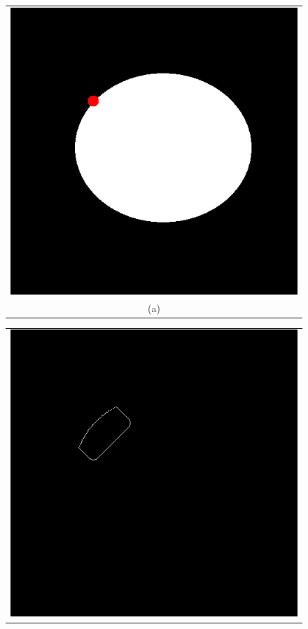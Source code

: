 \begin{figure}[h!]
\centering
\begin{minipage}{.49\textwidth}
\begin{tabular}{c}
\includegraphics[width=.9\textwidth]{results/circleSeedPartlyOutside} \\
(a)
\end{tabular}
\end{minipage}
\begin{minipage}{.49\textwidth}
\begin{tabular}{c}
\includegraphics[width=.9\textwidth]{results/circleSeedPartlyOutside300} \\

\end{tabular}
\end{minipage}
\end{figure}
